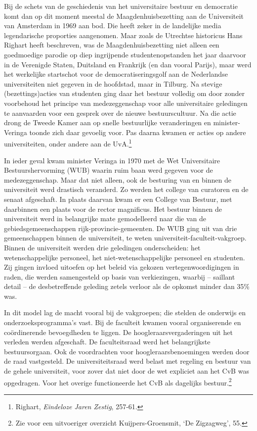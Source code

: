 \documentclass[smallauthor, chapterhaspagenum, nochapterinheader, pagenuminheader,  bigchapnum,medium2, tocpages, garamond, titleinheader]{jote-book}
\begin{document}
	Bij de schets van de geschiedenis van het universitaire bestuur en democratie komt dan op dit moment meestal de Maagdenhuisbezetting aan de Universiteit van Amsterdam in 1969 aan bod. Die heeft zeker in de landelijke media legendarische proporties aangenomen. Maar zoals de Utrechtse historicus Hans Righart heeft beschreven, was de Maagdenhuisbezetting niet alleen een goedmoedige parodie op diep ingrijpende studentenopstanden het jaar daarvoor in de Verenigde Staten, Duitsland en Frankrijk (en dan vooral Parijs), maar werd het werkelijke startschot voor de democratiseringsgolf aan de Nederlandse universiteiten niet gegeven in de hoofdstad, maar in Tilburg. Na stevige (bezettings)acties van studenten ging daar het bestuur volledig om door zonder voorbehoud het principe van medezeggenschap voor alle universitaire geledingen te aanvaarden voor een gesprek over de nieuwe bestuurscultuur. Na die actie drong de Tweede Kamer aan op snelle bestuurlijke veranderingen en minister-Veringa toonde zich daar gevoelig voor. Pas daarna kwamen er acties op andere universiteiten, onder andere aan de UvA.\footnote{Righart, \emph{Eindeloze Jaren Zestig}, 257-61.}



	In ieder geval kwam minister Veringa in 1970 met de Wet Universitaire Bestuurshervorming (WUB) waarin ruim baan werd gegeven voor de medezeggenschap. Maar dat niet alleen, ook de besturing van en binnen de universiteit werd drastisch veranderd. Zo werden het college van curatoren en de senaat afgeschaft. In plaats daarvan kwam er een College van Bestuur, met daarbinnen een plaats voor de rector magnificus. Het bestuur binnen de universiteit werd in belangrijke mate gemodelleerd naar die van de gebiedsgemeenschappen rijk-provincie-gemeenten. De WUB ging uit van drie gemeenschappen binnen de universiteit, te weten universiteit-faculteit-vakgroep. Binnen de universiteit werden drie geledingen onderscheiden: het wetenschappelijke personeel, het niet-wetenschappelijke personeel en studenten. Zij gingen invloed uitoefen op het beleid via gekozen vertegenwoordigingen in raden, die werden samengesteld op basis van verkiezingen, waarbij -- saillant detail -- de desbetreffende geleding zetels verloor als de opkomst minder dan 35\% was.



	In dit model lag de macht vooral bij de vakgroepen; die stelden de onderwijs en onderzoeksprogramma's vast. Bij de faculteit kwamen vooral organiserende en coördinerende bevoegdheden te liggen. De hoogleraarsvergaderingen uit het verleden werden afgeschaft. De faculteitsraad werd het belangrijkste bestuursorgaan. Ook de voordrachten voor hoogleraarsbenoemingen werden door de raad vastgesteld. De universiteitsraad werd belast met regeling en bestuur van de gehele universiteit, voor zover dat niet door de wet expliciet aan het CvB was opgedragen. Voor het overige functioneerde het CvB als dagelijks bestuur.\footnote{Zie voor een uitvoeriger overzicht Kuijpers-Groensmit, ‘De Zigzagweg', 55.}
\end{document}

